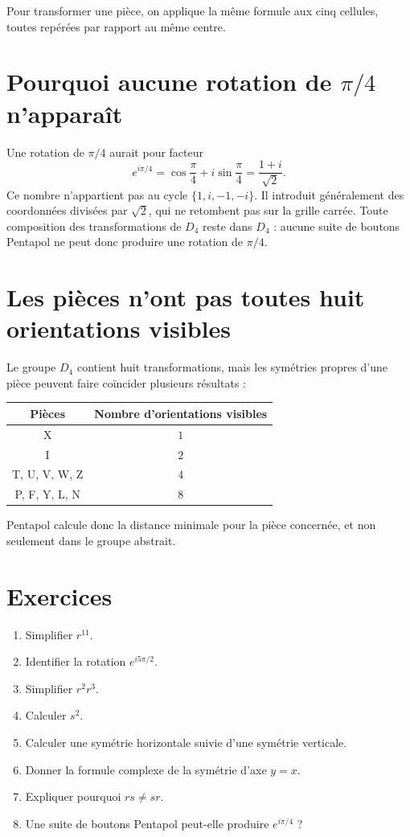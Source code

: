 \documentclass[11pt,a4paper]{article}
\begin{document}
Pour transformer une pi\`ece, on applique la m\^eme formule aux cinq cellules, toutes rep\'er\'ees
par rapport au m\^eme centre.

\section{Pourquoi aucune rotation de $\pi/4$ n'appara\^it}

Une rotation de $\pi/4$ aurait pour facteur
\[
  e^{i\pi/4}=\cos\frac{\pi}{4}+i\sin\frac{\pi}{4}
  =\frac{1+i}{\sqrt2}.
\]
Ce nombre n'appartient pas au cycle $\{1,i,-1,-i\}$. Il introduit g\'en\'eralement des coordonn\'ees
divis\'ees par $\sqrt2$, qui ne retombent pas sur la grille carr\'ee. Toute composition des
transformations de $D_4$ reste dans $D_4$ : aucune suite de boutons Pentapol ne peut donc produire
une rotation de $\pi/4$.

\section{Les pi\`eces n'ont pas toutes huit orientations visibles}

Le groupe $D_4$ contient huit transformations, mais les sym\'etries propres d'une pi\`ece peuvent
faire co\"incider plusieurs r\'esultats :

\begin{center}
\begin{tabular}{cc}
\toprule
Pi\`eces & Nombre d'orientations visibles\\
\midrule
X & $1$\\
I & $2$\\
T, U, V, W, Z & $4$\\
P, F, Y, L, N & $8$\\
\bottomrule
\end{tabular}
\end{center}

Pentapol calcule donc la distance minimale pour la pi\`ece concern\'ee, et non seulement dans le
groupe abstrait.

\section{Exercices}

\begin{enumerate}
  \item Simplifier $r^{11}$.
  \item Identifier la rotation $e^{i5\pi/2}$.
  \item Simplifier $r^2r^3$.
  \item Calculer $s^2$.
  \item Calculer une sym\'etrie horizontale suivie d'une sym\'etrie verticale.
  \item Donner la formule complexe de la sym\'etrie d'axe $y=x$.
  \item Expliquer pourquoi $rs\neq sr$.
  \item Une suite de boutons Pentapol peut-elle produire $e^{i\pi/4}$ ?
\end{enumerate}
\end{document}
